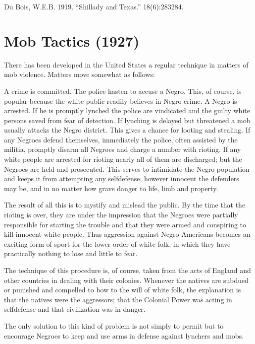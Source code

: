 \documentclass[letterpaper,10pt,english]{jupyterBook}
\begin{document}
\sphinxAtStartPar
{} Du Bois, W.E.B. 1919. “Shillady and Texas.”  18(6):283\sphinxhyphen{}284.


\section{Mob Tactics (1927)}
\label{\detokenize{Volumes/34/06/mob_tactics:mob-tactics-1927}}\label{\detokenize{Volumes/34/06/mob_tactics::doc}}
\sphinxAtStartPar
There has been developed in the United States a regular technique in matters of mob violence. Matters move somewhat as follows:

\sphinxAtStartPar
A crime is committed. The police hasten to accuse a Negro. This, of course, is popular because the white public readily believes in Negro crime. A Negro is arrested. If he is promptly lynched the police are vindicated and the guilty white persons saved from fear of detection. If lynching is delayed but threatened a mob usually attacks the Negro district. This gives a chance for looting and stealing. If any Negroes defend themselves, immediately the police, often assisted by the militia, promptly disarm all Negroes and charge a number with rioting. If any white people are arrested for rioting nearly all of them are discharged; but the Negroes are held and prosecuted. This serves to intimidate the Negro population and keeps it from attempting any self\sphinxhyphen{}defense, however innocent the defenders may be, and in no matter how grave danger to life, limb and property.

\sphinxAtStartPar
The result of all this is to mystify and mislead the public. By the time that the rioting is over, they are under the impression that the Negroes were partially responsible for starting the trouble and that they were armed and conspiring to kill innocent white people. Thus aggression against Negro Americans becomes an exciting form of sport for the lower order of white folk, in which they have practically nothing to lose and little to fear.

\sphinxAtStartPar
The technique of this procedure is, of course, taken from the acts of England and other countries in dealing with their colonies. Whenever the natives are subdued or punished and compelled to bow to the will of white folk, the explanation is that the natives were the aggressors; that the Colonial Power was acting in self\sphinxhyphen{}defense and that civilization was in danger.

\sphinxAtStartPar
The only solution to this kind of problem is not simply to permit but to encourage Negroes to keep and use arms in defense against lynchers and mobs.
\end{document}
